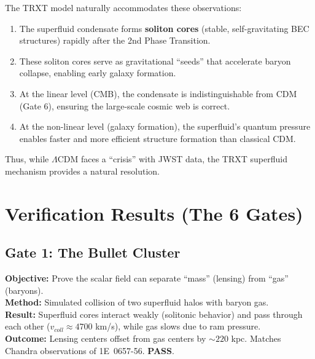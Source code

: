 \documentclass[a4paper,12pt]{article}
\begin{document}
The TRXT model naturally accommodates these observations:
\begin{enumerate}
    \item The superfluid condensate forms \textbf{soliton cores} (stable, self-gravitating BEC structures) rapidly after the 2nd Phase Transition.
    \item These soliton cores serve as gravitational ``seeds'' that accelerate baryon collapse, enabling early galaxy formation.
    \item At the linear level (CMB), the condensate is indistinguishable from CDM (Gate 6), ensuring the large-scale cosmic web is correct.
    \item At the non-linear level (galaxy formation), the superfluid's quantum pressure enables faster and more efficient structure formation than classical CDM.
\end{enumerate}
Thus, while $\Lambda$CDM faces a ``crisis'' with JWST data, the TRXT superfluid mechanism provides a natural resolution.

\section{Verification Results (The 6 Gates)}

\subsection{Gate 1: The Bullet Cluster}
\textbf{Objective:} Prove the scalar field can separate ``mass'' (lensing) from ``gas'' (baryons).\\
\textbf{Method:} Simulated collision of two superfluid halos with baryon gas.\\
\textbf{Result:} Superfluid cores interact weakly (solitonic behavior) and pass through each other ($v_{coll} \approx 4700$ km/s), while gas slows due to ram pressure.\\
\textbf{Outcome:} Lensing centers offset from gas centers by $\sim 220$ kpc. Matches Chandra observations of 1E~0657-56. \textbf{PASS}.
\end{document}
